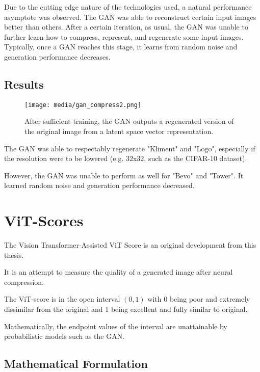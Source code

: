 Due to the cutting edge nature of the technologies used, a natural performance asymptote
was observed. The GAN was able to reconstruct certain input images better than others.
After a certain iteration, as usual, the GAN was unable to further learn how to compress,
represent, and regenerate some input images. Typically, once a GAN reaches this stage,
it learns from random noise and generation performance decreases.

\subsection{Results}

\begin{figure}[H]
	\begin{center}
	\texttt{[image: media/gan\_compress2.png]}
	\end{center}
	\caption[Neural Compression and Generation]{After sufficient training, the GAN outputs a regenerated
    version of the original image from a latent space vector representation.}
	\end{figure}

The GAN was able to respectably regenerate "Kliment" and "Logo", especially if the resolution
were to be lowered (e.g. 32x32, such as the CIFAR-10 dataset).

However, the GAN was unable to perform as well for "Bevo" and "Tower".
It learned random noise and generation performance decreased.

\section{ViT-Scores}

The Vision Transformer-Assisted ViT Score is an original development from this thesis. 

It is an attempt to measure the quality of a generated image after neural compression.

The ViT-score is in the open interval $(0,1)$ with $0$ being poor and extremely dissimilar from
the original and $1$ being excellent and fully similar to original.

Mathematically, the endpoint values of the interval are unattainable by probabilistic models
such as the GAN.

\subsection{Mathematical Formulation}

